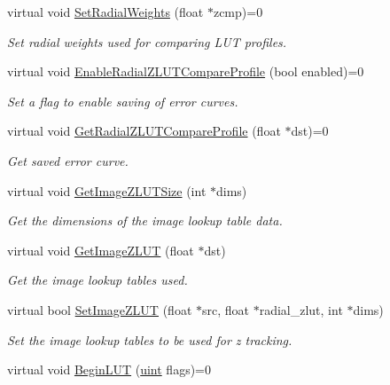 \begin{DoxyCompactItemize}
virtual void \hyperlink{class_queued_tracker_aaf4a1a0f17e2df7bc6dded2729d920f4}{Set\+Radial\+Weights} (float $\ast$zcmp)=0
\begin{DoxyCompactList}\small\item\em Set radial weights used for comparing L\+UT profiles. \end{DoxyCompactList}\item 
virtual void \hyperlink{class_queued_tracker_a53791fa740351a32ff707be9688aa99d}{Enable\+Radial\+Z\+L\+U\+T\+Compare\+Profile} (bool enabled)=0
\begin{DoxyCompactList}\small\item\em Set a flag to enable saving of error curves. \end{DoxyCompactList}\item 
virtual void \hyperlink{class_queued_tracker_ae6cc12f988a4f99d03a9783b4f978e7e}{Get\+Radial\+Z\+L\+U\+T\+Compare\+Profile} (float $\ast$dst)=0
\begin{DoxyCompactList}\small\item\em Get saved error curve. \end{DoxyCompactList}\item 
virtual void \hyperlink{class_queued_tracker_a29cd6f896d8bcdd93ee4a54bb7823f97}{Get\+Image\+Z\+L\+U\+T\+Size} (int $\ast$dims)
\begin{DoxyCompactList}\small\item\em Get the dimensions of the image lookup table data. \end{DoxyCompactList}\item 
virtual void \hyperlink{class_queued_tracker_af7d71b3673778f83f6494328182519ad}{Get\+Image\+Z\+L\+UT} (float $\ast$dst)
\begin{DoxyCompactList}\small\item\em Get the image lookup tables used. \end{DoxyCompactList}\item 
virtual bool \hyperlink{class_queued_tracker_abd440db1fddc0715bd41b90f1d169ee6}{Set\+Image\+Z\+L\+UT} (float $\ast$src, float $\ast$radial\+\_\+zlut, int $\ast$dims)
\begin{DoxyCompactList}\small\item\em Set the image lookup tables to be used for z tracking. \end{DoxyCompactList}\item 
virtual void \hyperlink{class_queued_tracker_aee4863d19778314cd30499cb85bd5251}{Begin\+L\+UT} (\hyperlink{std__incl_8h_a91ad9478d81a7aaf2593e8d9c3d06a14}{uint} flags)=0

\end{DoxyCompactItemize}
